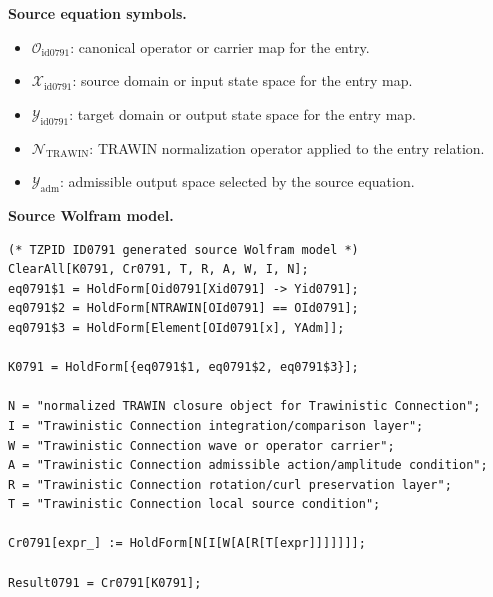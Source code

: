 \begin{minipage}[t]{0.49\linewidth}
\begingroup
\small
\raggedright
\textbf{Source equation symbols.}\par
\begin{itemize}[leftmargin=1.35em,itemsep=1pt,topsep=1pt,parsep=0pt]
    \item $\mathcal{O}_{\mathrm{id0791}}$: canonical operator or carrier map for the entry.
    \item $\mathcal{X}_{\mathrm{id0791}}$: source domain or input state space for the entry map.
    \item $\mathcal{Y}_{\mathrm{id0791}}$: target domain or output state space for the entry map.
    \item $\mathcal{N}_{\mathrm{TRAWIN}}$: TRAWIN normalization operator applied to the entry relation.
    \item $\mathcal{Y}_{\mathrm{adm}}$: admissible output space selected by the source equation.
\end{itemize}
\endgroup
\end{minipage}\hfill
\begin{minipage}[t]{0.47\linewidth}
\begingroup
\scriptsize
\raggedright
\textbf{Source Wolfram model.}\par
\begin{Verbatim}[fontsize=\tiny,breaklines=true,breakanywhere=true]
(* TZPID ID0791 generated source Wolfram model *)
ClearAll[K0791, Cr0791, T, R, A, W, I, N];
eq0791$1 = HoldForm[Oid0791[Xid0791] -> Yid0791];
eq0791$2 = HoldForm[NTRAWIN[OId0791] == OId0791];
eq0791$3 = HoldForm[Element[OId0791[x], YAdm]];

K0791 = HoldForm[{eq0791$1, eq0791$2, eq0791$3}];

N = "normalized TRAWIN closure object for Trawinistic Connection";
I = "Trawinistic Connection integration/comparison layer";
W = "Trawinistic Connection wave or operator carrier";
A = "Trawinistic Connection admissible action/amplitude condition";
R = "Trawinistic Connection rotation/curl preservation layer";
T = "Trawinistic Connection local source condition";

Cr0791[expr_] := HoldForm[N[I[W[A[R[T[expr]]]]]]];

Result0791 = Cr0791[K0791];
\end{Verbatim}
\endgroup
\end{minipage}

